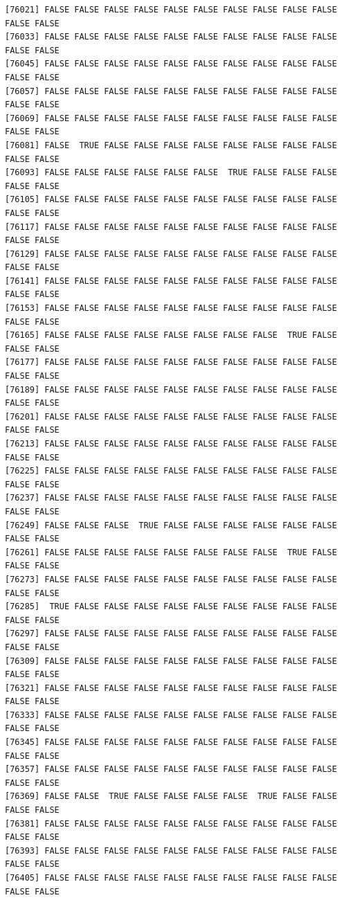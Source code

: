 \documentclass[
  a4paper,
  DIV=11,
  numbers=noendperiod]{scrartcl}
\begin{document}
\begin{verbatim}
[76021] FALSE FALSE FALSE FALSE FALSE FALSE FALSE FALSE FALSE FALSE FALSE FALSE
[76033] FALSE FALSE FALSE FALSE FALSE FALSE FALSE FALSE FALSE FALSE FALSE FALSE
[76045] FALSE FALSE FALSE FALSE FALSE FALSE FALSE FALSE FALSE FALSE FALSE FALSE
[76057] FALSE FALSE FALSE FALSE FALSE FALSE FALSE FALSE FALSE FALSE FALSE FALSE
[76069] FALSE FALSE FALSE FALSE FALSE FALSE FALSE FALSE FALSE FALSE FALSE FALSE
[76081] FALSE  TRUE FALSE FALSE FALSE FALSE FALSE FALSE FALSE FALSE FALSE FALSE
[76093] FALSE FALSE FALSE FALSE FALSE FALSE  TRUE FALSE FALSE FALSE FALSE FALSE
[76105] FALSE FALSE FALSE FALSE FALSE FALSE FALSE FALSE FALSE FALSE FALSE FALSE
[76117] FALSE FALSE FALSE FALSE FALSE FALSE FALSE FALSE FALSE FALSE FALSE FALSE
[76129] FALSE FALSE FALSE FALSE FALSE FALSE FALSE FALSE FALSE FALSE FALSE FALSE
[76141] FALSE FALSE FALSE FALSE FALSE FALSE FALSE FALSE FALSE FALSE FALSE FALSE
[76153] FALSE FALSE FALSE FALSE FALSE FALSE FALSE FALSE FALSE FALSE FALSE FALSE
[76165] FALSE FALSE FALSE FALSE FALSE FALSE FALSE FALSE  TRUE FALSE FALSE FALSE
[76177] FALSE FALSE FALSE FALSE FALSE FALSE FALSE FALSE FALSE FALSE FALSE FALSE
[76189] FALSE FALSE FALSE FALSE FALSE FALSE FALSE FALSE FALSE FALSE FALSE FALSE
[76201] FALSE FALSE FALSE FALSE FALSE FALSE FALSE FALSE FALSE FALSE FALSE FALSE
[76213] FALSE FALSE FALSE FALSE FALSE FALSE FALSE FALSE FALSE FALSE FALSE FALSE
[76225] FALSE FALSE FALSE FALSE FALSE FALSE FALSE FALSE FALSE FALSE FALSE FALSE
[76237] FALSE FALSE FALSE FALSE FALSE FALSE FALSE FALSE FALSE FALSE FALSE FALSE
[76249] FALSE FALSE FALSE  TRUE FALSE FALSE FALSE FALSE FALSE FALSE FALSE FALSE
[76261] FALSE FALSE FALSE FALSE FALSE FALSE FALSE FALSE  TRUE FALSE FALSE FALSE
[76273] FALSE FALSE FALSE FALSE FALSE FALSE FALSE FALSE FALSE FALSE FALSE FALSE
[76285]  TRUE FALSE FALSE FALSE FALSE FALSE FALSE FALSE FALSE FALSE FALSE FALSE
[76297] FALSE FALSE FALSE FALSE FALSE FALSE FALSE FALSE FALSE FALSE FALSE FALSE
[76309] FALSE FALSE FALSE FALSE FALSE FALSE FALSE FALSE FALSE FALSE FALSE FALSE
[76321] FALSE FALSE FALSE FALSE FALSE FALSE FALSE FALSE FALSE FALSE FALSE FALSE
[76333] FALSE FALSE FALSE FALSE FALSE FALSE FALSE FALSE FALSE FALSE FALSE FALSE
[76345] FALSE FALSE FALSE FALSE FALSE FALSE FALSE FALSE FALSE FALSE FALSE FALSE
[76357] FALSE FALSE FALSE FALSE FALSE FALSE FALSE FALSE FALSE FALSE FALSE FALSE
[76369] FALSE FALSE  TRUE FALSE FALSE FALSE FALSE  TRUE FALSE FALSE FALSE FALSE
[76381] FALSE FALSE FALSE FALSE FALSE FALSE FALSE FALSE FALSE FALSE FALSE FALSE
[76393] FALSE FALSE FALSE FALSE FALSE FALSE FALSE FALSE FALSE FALSE FALSE FALSE
[76405] FALSE FALSE FALSE FALSE FALSE FALSE FALSE FALSE FALSE FALSE FALSE FALSE

\end{verbatim}
\end{document}

